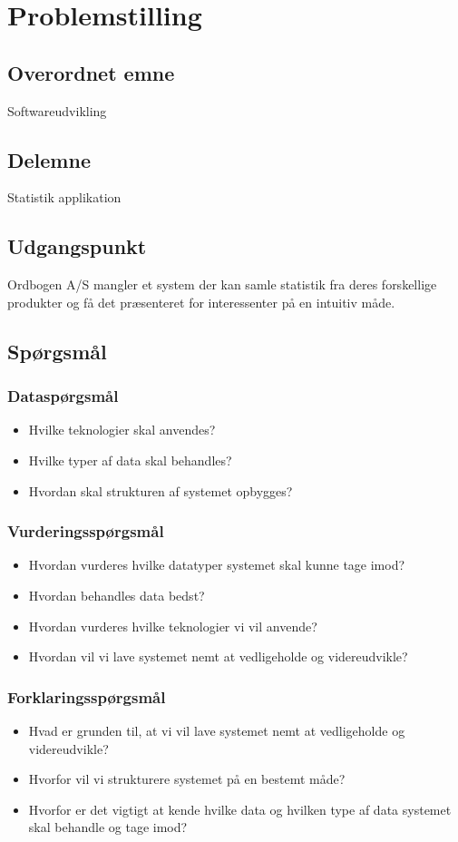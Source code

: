 \section{Problemstilling}
\subsection{Overordnet emne}
Softwareudvikling
\subsection{Delemne}
Statistik applikation
\subsection{Udgangspunkt}
Ordbogen A/S mangler et system der kan samle statistik fra deres forskellige produkter og få det præsenteret for interessenter på en intuitiv måde.
\subsection{Spørgsmål}
\subsubsection{Dataspørgsmål}
\begin{itemize}
    \item{Hvilke teknologier skal anvendes?}
    \item{Hvilke typer af data skal behandles?}
    \item{Hvordan skal strukturen af systemet opbygges?}
\end{itemize}
\subsubsection{Vurderingsspørgsmål}
\begin{itemize}
    \item{Hvordan vurderes hvilke datatyper systemet skal kunne tage imod?}
    \item{Hvordan behandles data bedst?}
    \item{Hvordan vurderes hvilke teknologier vi vil anvende?}
    \item{Hvordan vil vi lave systemet nemt at vedligeholde og videreudvikle?}
\end{itemize}
\subsubsection{Forklaringsspørgsmål}
\begin{itemize}
    \item{Hvad er grunden til, at vi vil lave systemet nemt at vedligeholde og videreudvikle?}
    \item{Hvorfor vil vi strukturere systemet på en bestemt måde?}
    \item{Hvorfor er det vigtigt at kende hvilke data og hvilken type af data systemet skal behandle og tage imod?}
\end{itemize}
